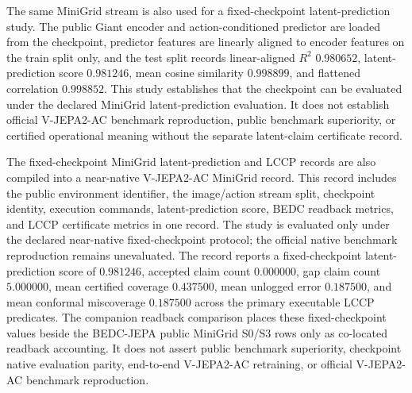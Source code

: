 The same MiniGrid stream is also used for a fixed-checkpoint latent-prediction
study.  The public Giant encoder and action-conditioned predictor
are loaded from the checkpoint, predictor features are linearly aligned to
encoder features on the train split only, and the test split records
linear-aligned $R^2$ $0.980652$, latent-prediction score $0.981246$, mean
cosine similarity $0.998899$, and flattened correlation $0.998852$.  This
study establishes that the checkpoint can be evaluated under the declared
MiniGrid latent-prediction evaluation.  It does not establish official
V-JEPA2-AC benchmark reproduction, public benchmark superiority, or certified
operational meaning without the separate latent-claim certificate record.

The fixed-checkpoint MiniGrid latent-prediction and LCCP records are also
compiled into a near-native V-JEPA2-AC MiniGrid record.  This record includes
the public environment identifier, the image/action stream split, checkpoint
identity, execution commands, latent-prediction score, BEDC readback metrics,
and LCCP certificate metrics in one record.  The study is evaluated only under
the declared near-native fixed-checkpoint protocol; the official native
benchmark reproduction remains unevaluated.  The record reports a fixed-checkpoint
latent-prediction score of $0.981246$, accepted claim count $0.000000$, gap
claim count $5.000000$, mean certified coverage $0.437500$, mean unlogged
error $0.187500$, and mean conformal miscoverage $0.187500$ across the
primary executable LCCP predicates.  The companion readback comparison places
these fixed-checkpoint values beside the BEDC-JEPA public MiniGrid S0/S3 rows
only as co-located readback accounting.  It does not assert public benchmark
superiority, checkpoint native evaluation parity, end-to-end V-JEPA2-AC
retraining, or official V-JEPA2-AC benchmark reproduction.

